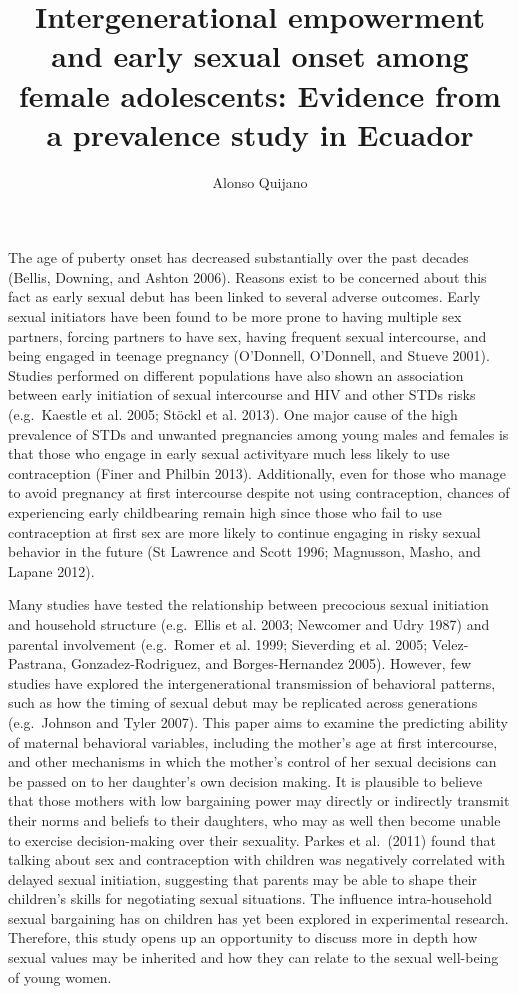 \documentclass[
]{article}
\title{Intergenerational empowerment and early sexual onset among female
adolescents: Evidence from a prevalence study in Ecuador}
\author{Alonso Quijano}
\date{}
\begin{document}
\maketitle

The age of puberty onset has decreased substantially over the past
decades (Bellis, Downing, and Ashton 2006). Reasons exist to be
concerned about this fact as early sexual debut has been linked to
several adverse outcomes. Early sexual initiators have been found to be
more prone to having multiple sex partners, forcing partners to have
sex, having frequent sexual intercourse, and being engaged in teenage
pregnancy (O'Donnell, O'Donnell, and Stueve 2001). Studies performed on
different populations have also shown an association between early
initiation of sexual intercourse and HIV and other STDs risks
(e.g.~Kaestle et al. 2005; Stöckl et al. 2013). One major cause of the
high prevalence of STDs and unwanted pregnancies among young males and
females is that those who engage in early sexual activityare much less
likely to use contraception (Finer and Philbin 2013). Additionally, even
for those who manage to avoid pregnancy at first intercourse despite not
using contraception, chances of experiencing early childbearing remain
high since those who fail to use contraception at first sex are more
likely to continue engaging in risky sexual behavior in the future (St
Lawrence and Scott 1996; Magnusson, Masho, and Lapane 2012).

Many studies have tested the relationship between precocious sexual
initiation and household structure (e.g.~Ellis et al. 2003; Newcomer and
Udry 1987) and parental involvement (e.g.~Romer et al. 1999; Sieverding
et al. 2005; Velez-Pastrana, Gonzadez-Rodriguez, and Borges-Hernandez
2005). However, few studies have explored the intergenerational
transmission of behavioral patterns, such as how the timing of sexual
debut may be replicated across generations (e.g.~Johnson and Tyler
2007). This paper aims to examine the predicting ability of maternal
behavioral variables, including the mother's age at first intercourse,
and other mechanisms in which the mother's control of her sexual
decisions can be passed on to her daughter's own decision making. It is
plausible to believe that those mothers with low bargaining power may
directly or indirectly transmit their norms and beliefs to their
daughters, who may as well then become unable to exercise
decision-making over their sexuality. Parkes et al.~(2011) found that
talking about sex and contraception with children was negatively
correlated with delayed sexual initiation, suggesting that parents may
be able to shape their children's skills for negotiating sexual
situations. The influence intra-household sexual bargaining has on
children has yet been explored in experimental research. Therefore, this
study opens up an opportunity to discuss more in depth how sexual values
may be inherited and how they can relate to the sexual well-being of
young women.
\end{document}

